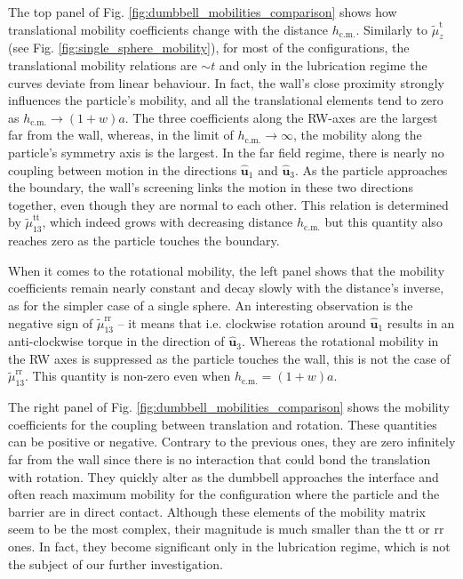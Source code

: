 \documentclass{master_thesis}
\begin{document}
The top panel of Fig. \ref{fig:dumbbell_mobilities_comparison} shows how translational mobility coefficients change with the distance $h_{\textrm{c.m.}}$. Similarly to $\tilde{\mu}^{\textrm{t}}_z$ (see Fig. \ref{fig:single_sphere_mobility}), for most of the configurations, the translational mobility relations are $\sim t$ and only in the lubrication regime the curves deviate from linear behaviour. In fact, the wall's close proximity strongly influences the particle's mobility, and all the translational elements tend to zero as $h_{\textrm{c.m.}} \rightarrow (1 + w) a$. The three coefficients along the RW-axes are the largest far from the wall, whereas, in the limit of $h_{\textrm{c.m.}}\rightarrow\infty$, the mobility along the particle's symmetry axis is the largest. In the far field regime, there is nearly no coupling between motion in the directions $\hat{\boldsymbol{u}}_1$ and $\hat{\boldsymbol{u}}_3$. As the particle approaches the boundary, the wall's screening links the motion in these two directions together, even though they are normal to each other. This relation is determined by $\tilde{\mu}^{\textrm{tt}}_{13}$, which indeed grows with decreasing distance $h_{\textrm{c.m.}}$ but this quantity also reaches zero as the particle touches the boundary.

When it comes to the rotational mobility, the left panel shows that the mobility coefficients remain nearly constant and decay slowly with the distance's inverse, as for the simpler case of a single sphere. An interesting observation is the negative sign of $\tilde{\mu}^{\textrm{rr}}_{13}$ -- it means that i.e. clockwise rotation around $\hat{\boldsymbol{u}}_1$ results in an anti-clockwise torque in the direction of $\hat{\boldsymbol{u}}_3$. Whereas the rotational mobility in the RW axes is suppressed as the particle touches the wall, this is not the case of $\tilde{\mu}^{\textrm{rr}}_{13}$. This quantity is non-zero even when $h_{\textrm{c.m.}} = (1 + w) a$.

The right panel of Fig. \ref{fig:dumbbell_mobilities_comparison} shows the mobility coefficients for the coupling between translation and rotation. These quantities can be positive or negative. Contrary to the previous ones, they are zero infinitely far from the wall since there is no interaction that could bond the translation with rotation. They quickly alter as the dumbbell approaches the interface and often reach maximum mobility for the configuration where the particle and the barrier are in direct contact. Although these elements of the mobility matrix seem to be the most complex, their magnitude is much smaller than the tt or rr ones. In fact, they become significant only in the lubrication regime, which is not the subject of our further investigation.
\end{document}
